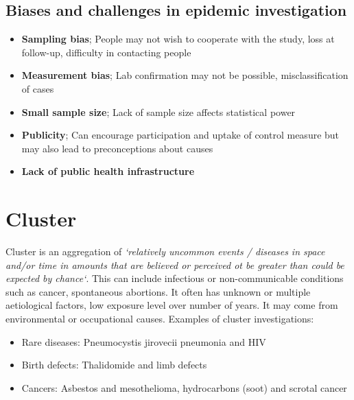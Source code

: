 \documentclass{article}
\begin{document}
\subsection*{Biases and challenges in epidemic investigation}
\begin{itemize}
    \item \textbf{Sampling bias}; People may not wish to cooperate with the study, loss at follow-up, difficulty in contacting people
    \item \textbf{Measurement bias}; Lab confirmation may not be possible, misclassification of cases
    \item \textbf{Small sample size}; Lack of sample size affects statistical power
    \item \textbf{Publicity}; Can encourage participation and uptake of control measure but may also lead to preconceptions about causes
    \item \textbf{Lack of public health infrastructure}
\end{itemize}

\pagebreak
\section{Cluster}
Cluster is an aggregation of \textit{`relatively uncommon events / diseases in space and/or time in amounts that are believed or perceived ot be greater than could be expected by chance`}. This can include infectious or non-communicable conditions such as cancer, spontaneous abortions. It often has unknown or multiple aetiological factors, low exposure level over number of years. It may come from environmental or occupational causes. Examples of cluster investigations:
\begin{itemize}
    \item Rare diseases: Pneumocystis jirovecii pneumonia and HIV
    \item Birth defects: Thalidomide and limb defects
    \item Cancers: Asbestos and mesothelioma, hydrocarbons (soot) and scrotal cancer
\end{itemize}
\end{document}

